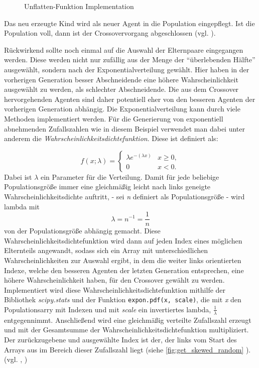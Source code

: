 \documentclass[parskip=half,titlepage]{scrartcl}
\begin{document}
\begin{figure}[h]
 
 \caption{Unflatten-Funktion Implementation}
 \label{fig:unflatten}
\end{figure}
\newpage

Das neu erzeugte Kind wird als neuer Agent in die Population eingepflegt. Ist die Population voll, dann ist der Crossovervorgang abgeschlossen (vgl. \cite[31 - 33]{eiben_smith_2016} ).

Rückwirkend sollte noch einmal auf die Auswahl der Elternpaare eingegangen werden. Diese werden nicht nur zufällig aus der Menge der ``überlebenden Hälfte'' ausgewählt, sondern nach der Exponentialverteilung gewählt. Hier haben in der vorherigen Generation besser Abschneidende eine höhere Wahrscheinlichkeit ausgewählt zu werden, als schlechter Abschneidende. Die aus dem Crossover hervorgehenden Agenten sind daher potentiell eher von den besseren Agenten der vorherigen Generation abhängig. Die Exponentialverteilung kann durch viele Methoden implementiert werden. Für die Generierung von exponentiell abnehmenden Zufallszahlen wie in diesem Beispiel verwendet man dabei unter anderem die \textit{Wahrscheinlichkeitsdichtefunktion}. Diese ist definiert als:


\begin{equation}
    f(x;\lambda) = \begin{cases}
    \lambda  e^{-(\lambda x)} & x \ge 0, \\
    0 & x < 0.
 \end{cases}
\end{equation}
Dabei ist $\lambda$ ein Parameter für die Verteilung. Damit für jede beliebige Populationsgröße immer eine gleichmäßig leicht nach links geneigte Wahrscheinlichkeitsdichte auftritt, - sei \textit{n} definiert als Populationsgröße - wird lambda mit 
\begin{equation}
    \lambda = n^{-1} = \frac{1}{n}
\end{equation}
von der Populationsgröße abhängig gemacht. Diese Wahrscheinlichkeitsdichtefunktion wird dann auf jeden Index eines möglichen Elternteils angewandt, sodass sich ein Array mit unterschiedlichen Wahrscheinlichkeiten zur Auswahl ergibt, in dem die weiter links orientierten Indexe, welche den besseren Agenten der letzten Generation entsprechen, eine höhere Wahrscheinlichkeit haben, für den Crossover gewählt zu werden. Implementiert wird diese Wahrscheinlichkeitsdichtefunktion mithilfe der Bibliothek \textit{scipy.stats} und der Funktion \lstinline|expon.pdf(x, scale)|, die mit \textit{x} den Populationsarry mit Indexen und mit \textit{scale} ein invertiertes lambda, $\frac{1}{\lambda}$ entgegennimmt. 
Anschließend wird eine gleichmäßig verteilte Zufallszahl erzeugt und mit der Gesamtsumme der Wahrscheinlichkeitsdichtefunktion multipliziert. Der zurückzugebene und ausgewählte Index ist der, der links vom Start des Arrays aus im Bereich dieser Zufallszahl liegt (siehe \cref{fig:get_skewed_random} ). (vgl. \cite{wikipedia_2021_exp_dist}, \cite{scipy_stats_expon})
\end{document}
